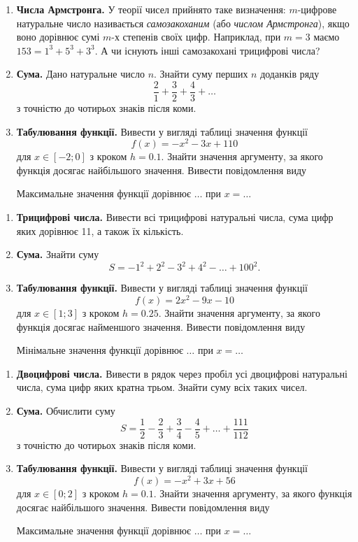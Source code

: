 \begin{enumerate}
\item \textbf{Числа Армстронга.} У теорії чисел прийнято таке визначення: $m$-цифрове натуральне число називається {\itshape самозакоханим} (або {\itshape числом Армстронга}), якщо воно дорівнює сумі $m$-х степенів своїх цифр. Наприклад, при $m=3$ маємо $153=1^3+5^3+3^3$. А чи існують інші самозакохані трицифрові числа?
\item \textbf{Сума.} Дано натуральне число $n$. Знайти суму перших $n$ доданків ряду
$$
\frac{2}{1}+\frac{3}{2}+\frac{4}{3}+\ldots
$$
з точністю до чотирьох знаків після коми.
\item \textbf{Табулювання функції.} Вивести у вигляді таблиці значення функції
$$
f(x)=-x^2-3x+110
$$
для $ x \in [-2; 0]$ з кроком $h=0.1$. Знайти значення аргументу, за якого функція досягає найбільшого значення. Вивести повідомлення виду

 {\ttfamily\color{blue} Максимальне значення функції дорівнює $\ldots$  при  $x = \ldots $ }
\end{enumerate}


 


\begin{enumerate}
\item \textbf{Трицифрові числа.} Вивести всі трицифрові натуральні числа, сума цифр яких дорівнює 11, а також їх кількість.
\item \textbf{Сума.} Знайти суму
$$
S=-1^2+2^2-3^2+4^2-\dots+100^2.
$$
\item \textbf{Табулювання функції.} Вивести у вигляді таблиці значення функції
$$
f(x)=2x^2-9x-10
$$
для $ x \in [1; 3] $ з кроком $ h = 0.25 $. Знайти значення аргументу, за якого функція досягає найменшого значення. Вивести повідомлення виду

 {\ttfamily\color{blue} Мінімальне значення функції дорівнює $\ldots$  при  $x = \ldots $ }
\end{enumerate}


 


\begin{enumerate}
\item \textbf{Двоцифрові числа.} Вивести в рядок через пробіл усі двоцифрові натуральні числа, сума цифр яких кратна трьом. Знайти суму всіх таких чисел.
\item \textbf{Сума.} Обчислити суму
$$
S=\frac{1}{2}-\frac{2}{3}+\frac{3}{4}-\frac{4}{5}+\ldots+\frac{111}{112}
$$
з точністю до чотирьох знаків після коми.
\item \textbf{Табулювання функції.} Вивести у вигляді таблиці значення функції
$$
f(x)=-x^2+3x+56
$$
для $ x \in [0; 2] $ з кроком $ h = 0.1 $. Знайти значення аргументу, за якого функція досягає найбільшого значення. Вивести повідомлення виду

 {\ttfamily\color{blue} Максимальне значення функції дорівнює $\ldots$  при  $x = \ldots $ }
\end{enumerate}


